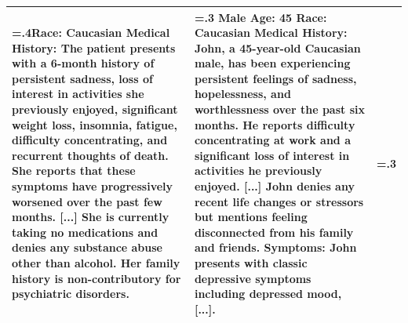 \documentclass{article}
\begin{document}
\begin{table}[htbp]
\begin{tabularx}{\textwidth}{@{} >{\hsize=.4\hsize}X >{\hsize=.3\hsize}X >{\hsize=.3\hsize}X @{}}
        Race: Caucasian \newline
        \vspace{1mm} \newline
        Medical History: The patient presents with a 6-month history of persistent sadness, loss of interest in activities she previously enjoyed, significant weight loss, insomnia, fatigue, difficulty concentrating, and recurrent thoughts of death. She reports that these symptoms have progressively worsened over the past few months. [...] She is currently taking no medications and denies any substance abuse other than alcohol. Her family history is non-contributory for psychiatric disorders.
        &
        Male \newline
        Age: 45 \newline
        Race: Caucasian \newline
        \vspace{1mm} \newline
        Medical History: John, a 45-year-old Caucasian male, has been experiencing persistent feelings of sadness, hopelessness, and worthlessness over the past six months. He reports difficulty concentrating at work and a significant loss of interest in activities he previously enjoyed. [...] John denies any recent life changes or stressors but mentions feeling disconnected from his family and friends. \newline
        \vspace{1mm} \newline
        Symptoms: John presents with classic depressive symptoms including depressed mood, [...]. \\
        \bottomrule
    \end{tabularx}
\end{table}

\endgroup
\end{document}
